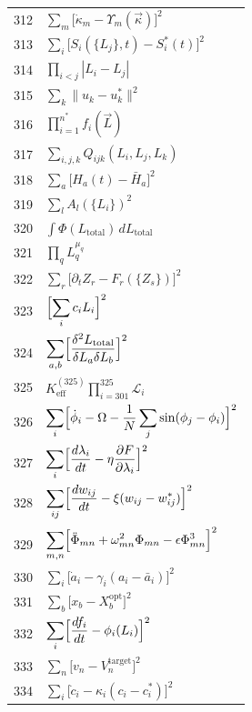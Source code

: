 \documentclass[11pt,a4paper]{article}
\begin{document}
\begin{longtable}{r p{}}
	312 & \(\displaystyle \sum_m\bigl[\dot\kappa_m - \Upsilon_m(\vec\kappa)\bigr]^2\) \\
	313 & \(\displaystyle \sum_i\bigl[S_i(\{L_j\},t) - S_i^*(t)\bigr]^2\) \\
	314 & \(\displaystyle \prod_{i<j}|L_i - L_j|\) \\
	315 & \(\displaystyle \sum_k\|u_k - u_k^*\|^2\) \\
	316 & \(\displaystyle \prod_{i=1}^{n^*}f_i(\vec L)\) \\
	317 & \(\displaystyle \sum_{i,j,k}Q_{ijk}(L_i,L_j,L_k)\) \\
	318 & \(\displaystyle \sum_a\bigl[H_a(t) - \bar H_a\bigr]^2\) \\
	319 & \(\displaystyle \sum_l A_l(\{L_i\})^2\) \\
	320 & \(\displaystyle \int\Phi(L_{\text{total}})\,dL_{\text{total}}\) \\
	321 & \(\displaystyle \prod_q L_q^{\mu_q}\) \\
	322 & \(\displaystyle \sum_r\bigl[\partial_t Z_r - F_r(\{Z_s\})\bigr]^2\) \\
	323 & \(\displaystyle \Bigl[\sum_i c_i L_i\Bigr]^2\) \\
	324 & \(\displaystyle \sum_{a,b}\Bigl[\frac{\delta^2 L_{\text{total}}}{\delta L_a\delta L_b}\Bigr]^2\) \\
	325 & \(\displaystyle K^{(325)}_{\mathrm{eff}}\prod_{i=301}^{325}\mathcal{L}_i\) \\
	326 & \(\displaystyle \sum_i\Bigl[\dot\phi_i - \Omega - \frac1N\sum_j\sin(\phi_j-\phi_i)\Bigr]^2\) \\
	327 & \(\displaystyle \sum_i\Bigl[\frac{d\lambda_i}{dt} - \eta\frac{\partial F}{\partial\lambda_i}\Bigr]^2\) \\
	328 & \(\displaystyle \sum_{ij}\Bigl[\frac{dw_{ij}}{dt} - \xi(w_{ij}-w_{ij}^*)\Bigr]^2\) \\
	329 & \(\displaystyle \sum_{m,n}\Bigl[\ddot\Phi_{mn} + \omega_{mn}^2\Phi_{mn} - \epsilon\Phi_{mn}^3\Bigr]^2\) \\
	330 & \(\displaystyle \sum_i\bigl[\dot a_i - \gamma_i(a_i - \bar a_i)\bigr]^2\) \\
	331 & \(\displaystyle \sum_b\bigl[x_b - X_b^{\text{opt}}\bigr]^2\) \\
	332 & \(\displaystyle \sum_i\Bigl[\frac{df_i}{dt} - \phi_i(L_i)\Bigr]^2\) \\
	333 & \(\displaystyle \sum_n\bigl[v_n - V_n^{\text{target}}\bigr]^2\) \\
	334 & \(\displaystyle \sum_i\bigl[\dot c_i - \kappa_i(c_i - c_i^*)\bigr]^2\) \\

\end{longtable}
\end{document}
